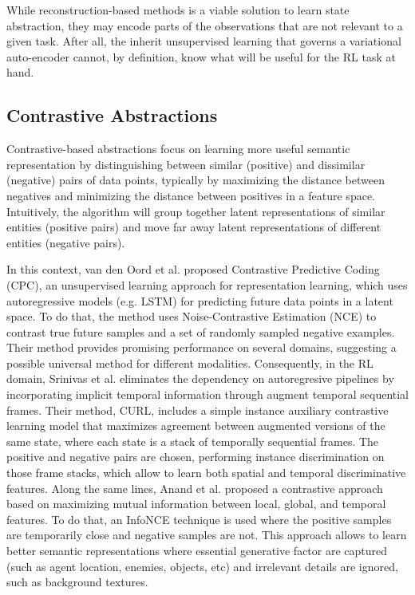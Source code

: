 While reconstruction-based methods is a viable solution to learn state abstraction, they may encode parts of the observations that are not relevant to a given task. After all, the inherit unsupervised learning that governs a variational auto-encoder cannot, by definition, know what will be useful for the RL task at hand. 


\subsection{Contrastive Abstractions}

Contrastive-based abstractions focus on learning more useful semantic representation by distinguishing between similar (positive) and dissimilar (negative) pairs of data points, typically by maximizing the distance between negatives and minimizing the distance between positives in a feature space. Intuitively, the algorithm will group together latent representations of similar entities (positive pairs) and move far away latent representations of different entities (negative pairs).

In this context, van den Oord et al. \cite{oord2018representation} proposed Contrastive Predictive Coding (CPC), an unsupervised learning approach for representation learning, which uses autoregressive models (e.g. LSTM) for predicting future data points in a latent space. To do that, the method uses Noise-Contrastive Estimation (NCE) to contrast true future samples and a set of randomly sampled negative examples. Their method provides promising performance on several domains, suggesting a possible universal method for different modalities. Consequently, in the RL domain, Srinivas et al. \cite{laskin2020curl} eliminates the dependency on autoregresive pipelines by incorporating implicit temporal information through augment temporal sequential frames. Their method, CURL, includes a simple instance auxiliary contrastive learning model that maximizes agreement between augmented versions of the same state, where each state is a stack of temporally sequential frames. The positive and negative pairs are chosen, performing instance discrimination on those frame stacks, which allow to learn both spatial and temporal discriminative features. Along the same lines, Anand et al. \cite{anand2019unsupervised} proposed a contrastive approach based on maximizing mutual information between local, global, and temporal features. To do that, an InfoNCE technique is used where the positive samples are temporarily close and negative samples are not. This approach allows to learn better semantic representations where essential generative factor are captured (such as agent location, enemies, objects, etc) and irrelevant details are ignored, such as background textures.

